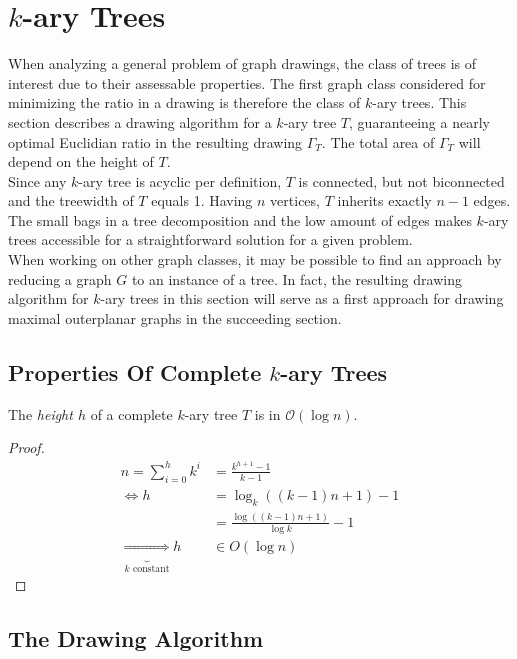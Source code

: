 \section{$k$-ary Trees}\label{s:k-ary_trees}
When analyzing a general problem of graph drawings, the class of trees is of interest due to their assessable properties. The first graph class considered for minimizing the ratio in a drawing is therefore the class of $k$-ary trees. This section describes a drawing algorithm for a $k$-ary tree $T$, guaranteeing a nearly optimal Euclidian ratio in the resulting drawing $\Gamma_T$. The total area of $\Gamma_T$ will depend on the height of $T$.\\
Since any $k$-ary tree is acyclic per definition, $T$ is connected, but not biconnected and the treewidth of $T$ equals 1. Having $n$ vertices, $T$ inherits exactly $n-1$ edges. The small bags in a tree decomposition and the low amount of edges makes $k$-ary trees accessible for a straightforward solution for a given problem.\\
When working on other graph classes, it may be possible to find an approach by reducing a graph $G$ to an instance of a tree. In fact, the resulting drawing algorithm for $k$-ary trees in this section will serve as a first approach for drawing maximal outerplanar graphs in the succeeding section.
\subsection{Properties Of Complete $k$-ary Trees}
\begin{lemma}The \emph{height $h$} of a complete $k$-ary tree $T$ is in $\mathcal{O}(\log n)$.\label{l:k-ary-tree_log_height}
\end{lemma}
\begin{proof}
	\begin{align}
		n = \sum_{i=0}^{h}k^i &= \frac{k^{h+1}-1}{k-1}\\
		\Leftrightarrow h &= \log_k((k-1)n+1)-1\\
		&= \frac{\log((k-1)n+1)}{\log k}-1\\
		\underbrace{\Rightarrow}_{k \text{ constant}}h &\in O(\log n)
	\end{align}
\end{proof}

\subsection{The Drawing Algorithm}


